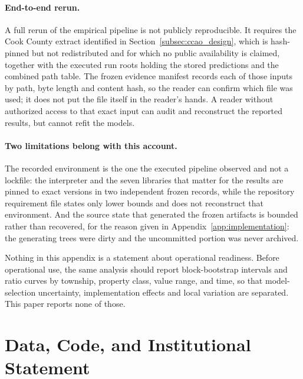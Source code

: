 \documentclass[10pt]{article}
\theoremstyle{definition}
\newcommand{\1}{\mathbf{1}}
\begin{document}
\paragraph{End-to-end rerun.} A full rerun of the empirical pipeline is not publicly reproducible.
It requires the Cook County extract identified in Section~\ref{subsec:ccao_design}, which is
hash-pinned but not redistributed and for which no public availability is claimed, together with
the executed run roots holding the stored predictions and the combined path table. The frozen
evidence manifest records each of those inputs by path, byte length and content hash, so the reader
can confirm which file was used; it does not put the file itself in the reader's hands. A reader
without authorized access to that exact input can audit and reconstruct the reported results, but
cannot refit the models.

\paragraph{Two limitations belong with this account.} The recorded environment is the one the
executed pipeline observed and not a lockfile: the interpreter and the seven libraries that matter
for the results are pinned to exact versions in two independent frozen records, while the
repository requirement file states only lower bounds and does not reconstruct that environment. And
the source state that generated the frozen artifacts is bounded rather than recovered, for the
reason given in Appendix~\ref{app:implementation}: the generating trees were dirty and the
uncommitted portion was never archived.

Nothing in this appendix is a statement about operational readiness. Before operational use, the
same analysis should report block-bootstrap intervals and ratio curves by township, property class,
value range, and time, so that model-selection uncertainty, implementation effects and local
variation are separated. This paper reports none of those.


\section*{Data, Code, and Institutional Statement}
\end{document}
